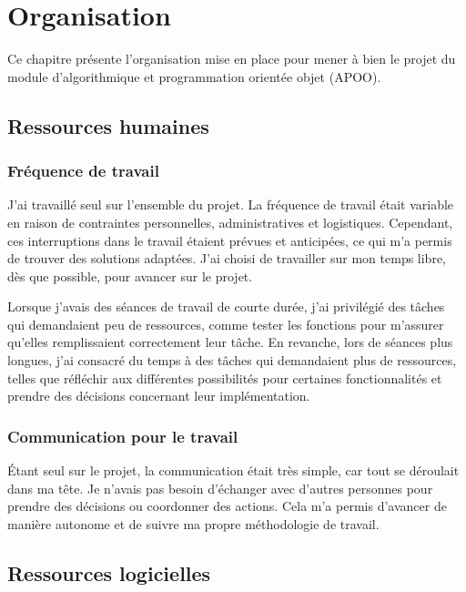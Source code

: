 \chapter*{Organisation}

Ce chapitre présente l'organisation mise en place pour mener à bien le projet du module d'algorithmique et programmation orientée objet (APOO).

\section{Ressources humaines}

\subsection{Fréquence de travail}

J'ai travaillé seul sur l'ensemble du projet. La fréquence de travail était variable en raison de contraintes personnelles, administratives et logistiques. Cependant, ces interruptions dans le travail étaient prévues et anticipées, ce qui m'a permis de trouver des solutions adaptées. J'ai choisi de travailler sur mon temps libre, dès que possible, pour avancer sur le projet.

Lorsque j'avais des séances de travail de courte durée, j'ai privilégié des tâches qui demandaient peu de ressources, comme tester les fonctions pour m'assurer qu'elles remplissaient correctement leur tâche. En revanche, lors de séances plus longues, j'ai consacré du temps à des tâches qui demandaient plus de ressources, telles que réfléchir aux différentes possibilités pour certaines fonctionnalités et prendre des décisions concernant leur implémentation.

\subsection{Communication pour le travail}

Étant seul sur le projet, la communication était très simple, car tout se déroulait dans ma tête. Je n'avais pas besoin d'échanger avec d'autres personnes pour prendre des décisions ou coordonner des actions. Cela m'a permis d'avancer de manière autonome et de suivre ma propre méthodologie de travail.

\newpage
\section{Ressources logicielles}

